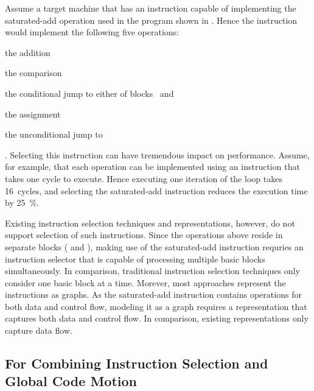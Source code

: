 Assume a \gls{target machine} that has an instruction capable of implementing
the saturated-add \gls{operation} used in the \gls{program} shown in
.
%
Hence the \gls{instruction} would implement the following five operations:%
%
\begin{inlinelist}[itemjoin={, }, itemjoin*={, and}]
  \item the  addition
  \item the  comparison
  \item the conditional jump to either of blocks~ and~
  \item the  assignment
  \item the unconditional jump to~
\end{inlinelist}.
%
Selecting this \gls{instruction} can have tremendous impact on performance.
%
Assume, for example, that each \gls{operation} can be implemented using an
\gls{instruction} that takes one cycle to execute. Hence executing one iteration
of the loop takes \num{16}~cycles, and selecting the saturated-add
\gls{instruction} reduces the execution time by \SI{25}{\percent}.

Existing \gls{instruction selection} techniques and representations, however, do
not support selection of such \glspl{instruction}.
%
Since the \glspl{operation} above reside in separate \glspl{block} (
and ), making use of the saturated-add \gls{instruction} requries an
\gls{instruction selector} that is capable of processing multiple \glspl{basic
  block} simultaneously.
%
In comparison, traditional \gls{instruction selection} techniques only consider
one \gls{basic block} at a time.
%
Morever, most approaches represent the \glspl{instruction} as \glspl{graph}.
%
As the saturated-add \gls{instruction} contains \glspl{operation} for both data
and control flow, modeling it as a \gls{graph} requires a representation that
captures both data and control flow.
%
In comparison, existing representations only capture data flow.


\subsection{For Combining Instruction Selection and Global Code Motion}

